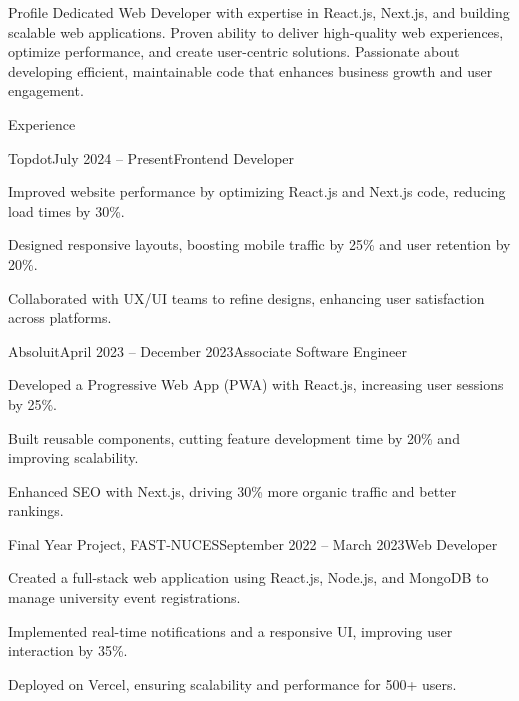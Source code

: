 \documentclass{resume}
\begin{document}
\sloppy

\begin{rSection}{Profile}
Dedicated Web Developer with expertise in React.js, Next.js, and building scalable web applications. Proven ability to deliver high-quality web experiences, optimize performance, and create user-centric solutions. Passionate about developing efficient, maintainable code that enhances business growth and user engagement.
\end{rSection}


\begin{rSection}{Experience}

\begin{rSubsection}{Topdot}{July 2024 -- Present}{Frontend Developer}{}
\item Improved website performance by optimizing React.js and Next.js code, reducing load times by 30\%.
\item Designed responsive layouts, boosting mobile traffic by 25\% and user retention by 20\%.
\item Collaborated with UX/UI teams to refine designs, enhancing user satisfaction across platforms.
\end{rSubsection}

\begin{rSubsection}{Absoluit}{April 2023 – December 2023}{Associate Software Engineer}{}
\item Developed a Progressive Web App (PWA) with React.js, increasing user sessions by 25\%.
\item Built reusable components, cutting feature development time by 20\% and improving scalability.
\item Enhanced SEO with Next.js, driving 30\% more organic traffic and better rankings.
\end{rSubsection}

\begin{rSubsection}{Final Year Project, FAST-NUCES}{September 2022 – March 2023}{Web Developer}{}
\item Created a full-stack web application using React.js, Node.js, and MongoDB to manage university event registrations.
\item Implemented real-time notifications and a responsive UI, improving user interaction by 35\%.
\item Deployed on Vercel, ensuring scalability and performance for 500+ users.
\end{rSubsection}

\end{rSection}
\end{document}
